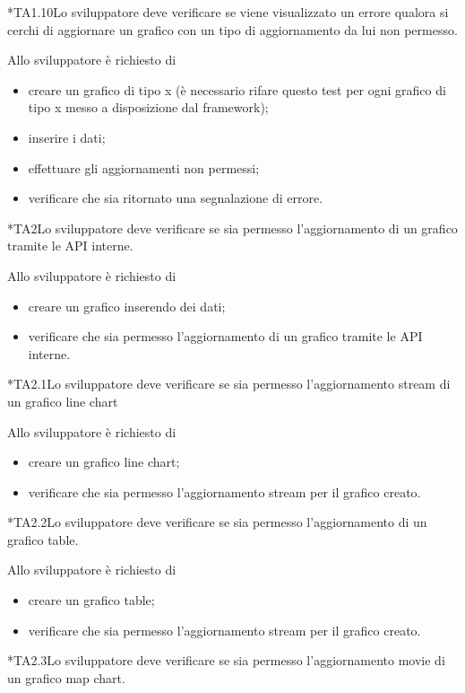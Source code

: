 	*{TA1.10}Lo sviluppatore deve verificare se viene visualizzato un errore qualora si cerchi di aggiornare un grafico con un tipo di aggiornamento da lui non permesso.

		Allo sviluppatore è richiesto di
		\begin{itemize}
			\item creare un grafico di tipo x (è necessario rifare questo test per ogni grafico di tipo x messo a disposizione dal framework);
			\item inserire i dati;
			\item effettuare gli aggiornamenti non permessi;
			\item verificare che sia ritornato una segnalazione di errore.
		\end{itemize}

	*{TA2}Lo sviluppatore deve verificare se sia permesso l'aggiornamento di un grafico tramite le API interne.
		
		Allo sviluppatore è richiesto di
		\begin{itemize}
			\item creare un grafico inserendo dei dati;
			\item verificare che sia permesso l'aggiornamento di un grafico tramite le API interne.
		\end{itemize}

	*{TA2.1}Lo sviluppatore deve verificare se sia permesso l'aggiornamento stream di un grafico line chart
		
		Allo sviluppatore è richiesto di
		\begin{itemize}
			\item creare un grafico line chart;
			\item verificare che sia permesso l'aggiornamento stream per il grafico creato.
		\end{itemize}

	*{TA2.2}Lo sviluppatore deve verificare se sia permesso l'aggiornamento di un grafico table.
		
		Allo sviluppatore è richiesto di
		\begin{itemize}
			\item creare un grafico table;
			\item verificare che sia permesso l'aggiornamento stream per il grafico creato.
		\end{itemize}

	*{TA2.3}Lo sviluppatore deve verificare se sia permesso l'aggiornamento movie di un grafico map chart.
		
